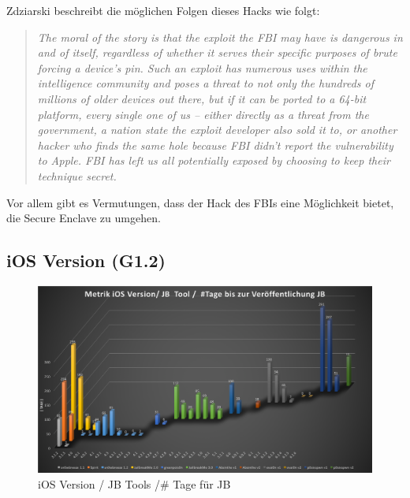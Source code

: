 Zdziarski beschreibt die möglichen Folgen dieses Hacks wie folgt: 
\begin{quote}
    \textit{\glqq The moral of the story is that the exploit the FBI may have is dangerous in and of itself, regardless of whether it serves their specific purposes of brute forcing a device’s pin. Such an exploit has numerous uses within the intelligence community and poses a threat to not only the hundreds of millions of older devices out there, but if it can be ported to a 64-bit platform, every single one of us – either directly as a threat from the government, a nation state the exploit developer also sold it to, or another hacker who finds the same hole because FBI didn’t report the vulnerability to Apple. FBI has left us all potentially exposed by choosing to keep their technique secret.\grqq{}} \cite{Hacking[4]} \par 
\end{quote}
Vor allem gibt es Vermutungen, dass der Hack des FBIs eine Möglichkeit bietet, die Secure Enclave zu umgehen.


\newpage
\subsection{iOS Version  (G1.2)}
\label{sec:Frage1iOSVersion} 

\begin{figure}[hp!]
        \centering
                \includegraphics[scale=0.38]{Bilder/Frage1_1.png}
        \caption{iOS Version / JB Tools /\# Tage für JB \protect\footnotemark}
        \label{fig:AnalyseiOSJB1}        
\end{figure}


